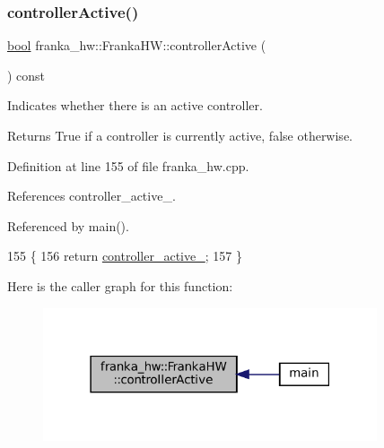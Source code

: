 \subsubsection{\texorpdfstring{controller\+Active()}{controllerActive()}}
{\footnotesize\ttfamily \hyperlink{classbool}{bool} franka\+\_\+hw\+::\+Franka\+H\+W\+::controller\+Active (\begin{DoxyParamCaption}{ }\end{DoxyParamCaption}) const\hspace{0.3cm}{\ttfamily [noexcept]}}

Indicates whether there is an active controller.

\begin{DoxyReturn}{Returns}
True if a controller is currently active, false otherwise. 
\end{DoxyReturn}


Definition at line 155 of file franka\+\_\+hw.\+cpp.



References controller\+\_\+active\+\_\+.



Referenced by main().


\begin{DoxyCode}
155                                                \{
156   \textcolor{keywordflow}{return} \hyperlink{classfranka__hw_1_1FrankaHW_aa207ee4ba133fdb1b3887c9639b47b40}{controller\_active\_};
157 \}
\end{DoxyCode}
Here is the caller graph for this function\+:
\nopagebreak
\begin{figure}[H]
\begin{center}
\leavevmode
\includegraphics[width=279pt]{classfranka__hw_1_1FrankaHW_a8fcc0a82b0c13cdbd1de7fea38c3ecc3_icgraph}
\end{center}
\end{figure}
\mbox{\label{classfranka__hw_1_1FrankaHW_ab29812769471d212a30dac6c19c12884}} 
